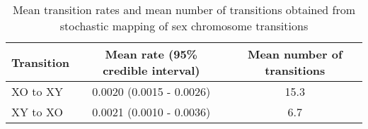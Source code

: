 \begin{table}[ht]
\centering
\begin{tabular}{lcc}
\hline
\textbf{Transition} & \textbf{Mean rate (95\% credible interval)} & \textbf{Mean number of transitions} \\ \hline
XO to XY            & 0.0020 (0.0015 - 0.0026)                    & 15.3                                \\
XY to XO            & 0.0021 (0.0010 - 0.0036)                    & 6.7                                 \\ \hline
\end{tabular}
\caption{Mean transition rates and mean number of transitions obtained from stochastic mapping of sex chromosome transitions}
\label{tab:simmap.summary}
\end{table}
